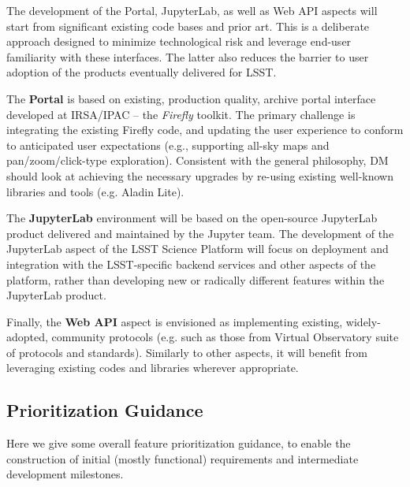 \documentclass[DM,lsstdraft,toc]{lsstdoc}
\begin{document}
The development of the Portal, JupyterLab, as well as Web API aspects will start from significant existing code bases and prior art. This is a deliberate approach designed to minimize technological risk and leverage end-user familiarity with these interfaces. The latter also reduces the barrier to user adoption of the products eventually delivered for LSST.

The {\bf Portal} is based on existing, production quality, archive portal interface developed at IRSA/IPAC -- the {\em Firefly} toolkit. The primary challenge is integrating the existing Firefly code, and updating the user experience to conform to anticipated user expectations (e.g., supporting all-sky maps and pan/zoom/click-type exploration). Consistent with the general philosophy, DM should look at achieving the necessary upgrades by re-using existing well-known libraries and tools (e.g. Aladin Lite).

The {\bf JupyterLab} environment will be based on the open-source JupyterLab product delivered and maintained by the Jupyter team. The development of the JupyterLab aspect of the LSST Science Platform will focus on deployment and integration with the LSST-specific backend services and other aspects of the platform, rather than developing new or radically different features within the JupyterLab product.

Finally, the {\bf Web API} aspect is envisioned as implementing existing, widely-adopted, community protocols (e.g. such as those from Virtual Observatory suite of protocols and standards). Similarly to other aspects, it will benefit from leveraging existing codes and libraries wherever appropriate.

\subsection{Prioritization Guidance}

Here we give some overall feature prioritization guidance, to enable the construction of initial (mostly functional) requirements and intermediate development milestones.
\end{document}
